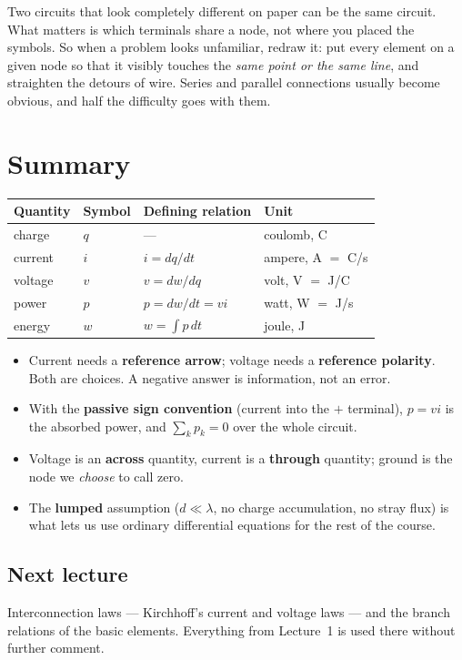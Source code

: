 \documentclass[11pt,a4paper]{article}
\newcommand{\Icol}[1]{\textcolor{ccur}{#1}}
\newcommand{\Vcol}[1]{\textcolor{cvolt}{#1}}
\newcommand{\Pcol}[1]{\textcolor{cpow}{#1}}
\newcommand{\Qcol}[1]{\textcolor{ccharge}{#1}}
\begin{document}
\begin{cautionbox}
Two circuits that look completely different on paper can be the same circuit. What
matters is which terminals share a node, not where you placed the symbols. So when a
problem looks unfamiliar, redraw it: put every element on a given node so that it visibly
touches the \emph{same point or the same line}, and straighten the detours of wire. Series
and parallel connections usually become obvious, and half the difficulty goes with them.
\end{cautionbox}

\section*{Summary}

\begin{center}
\small
\begin{tabular}{@{}l l l l@{}}
\toprule
\textbf{Quantity} & \textbf{Symbol} & \textbf{Defining relation} & \textbf{Unit}\\
\midrule
charge  & \Qcol{$q$} & --- & coulomb, C\\
current & \Icol{$i$} & $i = dq/dt$ & ampere, A $=$ C/s\\
voltage & \Vcol{$v$} & $v = dw/dq$ & volt, V $=$ J/C\\
power   & \Pcol{$p$} & $p = dw/dt = vi$ & watt, W $=$ J/s\\
energy  & \Pcol{$w$} & $w = \int p\,dt$ & joule, J\\
\bottomrule
\end{tabular}
\end{center}

\begin{itemize}
  \item Current needs a \textbf{reference arrow}; voltage needs a \textbf{reference
        polarity}. Both are choices. A negative answer is information, not an error.
  \item With the \textbf{passive sign convention} (current into the $+$ terminal),
        $p = vi$ is the absorbed power, and $\sum_k p_k = 0$ over the whole circuit.
  \item Voltage is an \textbf{across} quantity, current is a \textbf{through} quantity;
        ground is the node we \emph{choose} to call zero.
  \item The \textbf{lumped} assumption ($d \ll \lambda$, no charge accumulation, no stray
        flux) is what lets us use ordinary differential equations for the rest of the
        course.
\end{itemize}

\subsection*{Next lecture}
Interconnection laws --- Kirchhoff's current and voltage laws --- and the branch relations
of the basic elements. Everything from Lecture~1 is used there without further comment.
\end{document}
